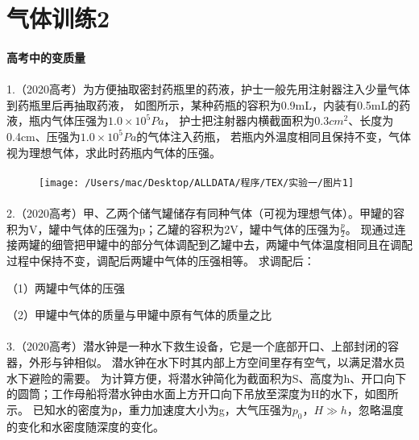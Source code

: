 \documentclass[UTF8]{ctexart}
\begin{document}
\section*{气体训练2}
\paragraph{高考中的变质量}
\kaishu{}
\paragraph{}
    1.（2020高考）为方便抽取密封药瓶里的药液，护士一般先用注射器注入少量气体到药瓶里后再抽取药液，
如图所示，某种药瓶的容积为0.9mL，内装有0.5mL的药液，瓶内气体压强为$1.0 \times 10^{5}Pa$，
护士把注射器内横截面积为$0.3cm^{2}$、长度为0.4cm、压强为$1.0 \times 10^{5}Pa$的气体注入药瓶，
若瓶内外温度相同且保持不变，气体视为理想气体，求此时药瓶内气体的压强。
\begin{figure}[htbp]
\paragraph{} \texttt{[image: /Users/mac/Desktop/ALLDATA/程序/TEX/实验一/图片1]}\label{fig:figure}
\end{figure}

\paragraph{}
    2.（2020高考）甲、乙两个储气罐储存有同种气体（可视为理想气体）。甲罐的容积为V，罐中气体的压强为p；乙罐的容积为2V，罐中气体的压强为$\frac{p}{2}$。
    现通过连接两罐的细管把甲罐中的部分气体调配到乙罐中去，两罐中气体温度相同且在调配过程中保持不变，调配后两罐中气体的压强相等。
    求调配后：

    （1）两罐中气体的压强

    （2）甲罐中气体的质量与甲罐中原有气体的质量之比
\paragraph{}
\paragraph{}
\paragraph{}

    3.（2020高考）潜水钟是一种水下救生设备，它是一个底部开口、上部封闭的容器，外形与钟相似。
    潜水钟在水下时其内部上方空间里存有空气，以满足潜水员水下避险的需要。
    为计算方便，将潜水钟简化为截面积为S、高度为h、开口向下的圆筒；工作母船将潜水钟由水面上方开口向下吊放至深度为H的水下，如图所示。
    已知水的密度为ρ，重力加速度大小为g，大气压强为$p_{0}$，$H \gg h$，忽略温度的变化和水密度随深度的变化。
\end{document}
